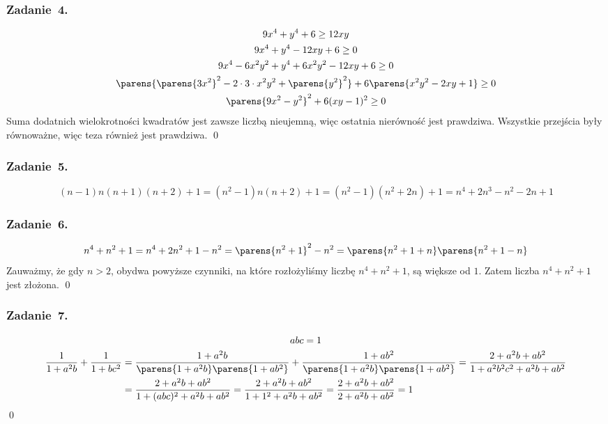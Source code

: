 \subsubsection*{Zadanie~4.}
\begin{gather*}
    9x^4 + y^4 + 6 \geq 12xy\\
    9x^4 + y^4 - 12xy + 6 \geq 0\\
    9x^4 - 6x^2y^2 + y^4 + 6x^2y^2 - 12xy + 6 \geq 0\\
    \parens{\parens{3x^2}^2 - 2 \cdot 3 \cdot x^2y^2 + \parens{y^2}^2} + 6\parens{x^2y^2 - 2xy + 1} \geq 0\\
    \parens{9x^2 - y^2}^2 + 6(xy - 1)^2 \geq 0
\end{gather*}
Suma dodatnich wielokrotności kwadratów jest zawsze liczbą nieujemną, więc ostatnia nierówność jest prawdziwa. Wszystkie przejścia były równoważne, więc teza również jest prawdziwa.
\qed
\subsubsection*{Zadanie~5.}
\begin{equation*}
    (n - 1)n(n + 1)(n + 2) + 1 = (n^2 - 1)n(n + 2) + 1 = (n^2 - 1)(n^2 + 2n) + 1 = n^4 + 2n^3 - n^2 - 2n + 1
\end{equation*}
\subsubsection*{Zadanie~6.}
\begin{equation*}
    n^4 + n^2 + 1 = n^4 + 2n^2 + 1 - n^2 = \parens{n^2 + 1}^2 - n^2 = \parens{n^2 + 1 + n} \parens{n^2 + 1 - n}
\end{equation*}
Zauważmy, że gdy \(n > 2\), obydwa powyższe czynniki, na które rozłożyliśmy liczbę \(n^4 + n^2 + 1\), są większe od \(1\). Zatem liczba \(n^4 + n^2 + 1\) jest złożona.
\qed
\subsubsection*{Zadanie~7.}
\begin{gather*}
    abc = 1\\
    \begin{split}
        \frac{1}{1 + a^2b} + \frac{1}{1 + bc^2}
            &= \frac{1 + a^2b}{\parens{1 + a^2b} \parens{1 + ab^2}} + \frac{1 + ab^2}{\parens{1 + a^2b} \parens{1 + ab^2}}
            = \frac{2 + a^2b + ab^2}{1 + a^2b^2c^2 + a^2b + ab^2}\\
            &= \frac{2 + a^2b + ab^2}{1 + (abc)^2 + a^2b + ab^2}
            = \frac{2 + a^2b + ab^2}{1 + 1^2 + a^2b + ab^2}
            = \frac{2 + a^2b + ab^2}{2 + a^2b + ab^2}
            = 1
    \end{split}
\end{gather*}
\qed
